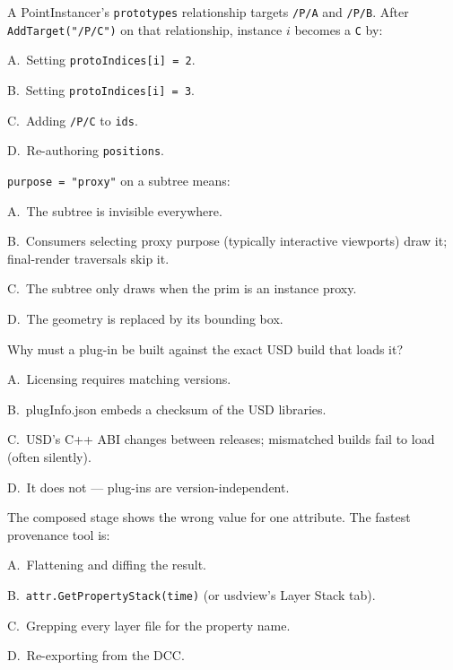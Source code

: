 A PointInstancer's \texttt{prototypes} relationship targets \texttt{/P/A}
and \texttt{/P/B}. After \texttt{AddTarget("/P/C")} on that relationship,
instance $i$ becomes a \texttt{C} by:
\begin{Choices}
  \item A.\ Setting \texttt{protoIndices[i] = 2}.
  \item B.\ Setting \texttt{protoIndices[i] = 3}.
  \item C.\ Adding \texttt{/P/C} to \texttt{ids}.
  \item D.\ Re-authoring \texttt{positions}.
\end{Choices}

\texttt{purpose = "proxy"} on a subtree means:
\begin{Choices}
  \item A.\ The subtree is invisible everywhere.
  \item B.\ Consumers selecting proxy purpose (typically interactive viewports) draw it; final-render traversals skip it.
  \item C.\ The subtree only draws when the prim is an instance proxy.
  \item D.\ The geometry is replaced by its bounding box.
\end{Choices}

Why must a plug-in be built against the exact USD build that loads it?
\begin{Choices}
  \item A.\ Licensing requires matching versions.
  \item B.\ plugInfo.json embeds a checksum of the USD libraries.
  \item C.\ USD's C++ ABI changes between releases; mismatched builds fail to load (often silently).
  \item D.\ It does not --- plug-ins are version-independent.
\end{Choices}

The composed stage shows the wrong value for one attribute. The fastest
provenance tool is:
\begin{Choices}
  \item A.\ Flattening and diffing the result.
  \item B.\ \texttt{attr.GetPropertyStack(time)} (or usdview's Layer Stack tab).
  \item C.\ Grepping every layer file for the property name.
  \item D.\ Re-exporting from the DCC.
\end{Choices}

